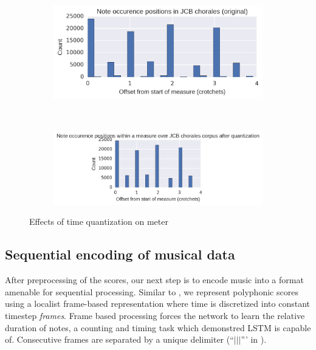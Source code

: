 \begin{figure}[htpb]
    \centering
    \begin{subfigure}[t]{0.48\textwidth}
        \centering
        \includegraphics[width=1.0\linewidth]{meter-usage-original.png}
    \end{subfigure}
    ~
    \begin{subfigure}[t]{0.48\textwidth}
        \centering
        \includegraphics[width=1.0\linewidth]{meter-usage-quantized.png}
    \end{subfigure}
    \caption{Effects of time quantization on meter}
    \label{fig:meter-time-quantization}
\end{figure}

\subsection{Sequential encoding of musical data}

After preprocessing of the scores, our next step is to encode music into a
format amenable for sequential processing. Similar to
\citep{todd1989connectionist}, we represent polyphonic scores using a localist
frame-based representation where time is discretized into constant timestep
\emph{frames}. Frame based processing forces the network to learn the relative
duration of notes, a counting and timing task which \citep{gers2002learning}
demonstred LSTM is capable of. Consecutive frames are separated by a unique
delimiter (``$|||$''' in ).

